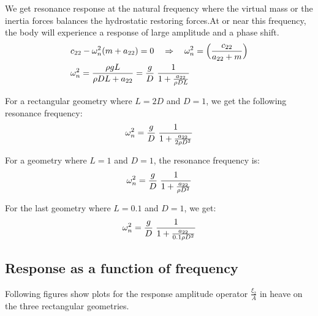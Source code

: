 \documentclass[a4paper,10pt]{article}
\begin{document}
We get resonance response at the natural frequency where the virtual mass or the inertia forces balances the hydrostatic restoring forces.At or near this frequency, the body will experience a response of large amplitude and a phase shift.\\

\begin{align}
&c_{22} - \omega_n^2 (m + a_{22}) = 0 \quad \Rightarrow \quad \omega_n^2 = \Big( \frac{c_{22}}{a_{22} + m} \Big)\\
& \omega_n^2 = \frac{\rho g L}{\rho D L + a_{22}} = \frac{g}{D}\hspace{1mm}\frac{1}{1 + \frac{a_{22}}{\rho D L}} 
\end{align}

For a rectangular geometry where $L=2D$ and $D=1$, we get the following resonance frequency:
$$\omega_n^2 = \frac{g}{D}\hspace{1mm}\frac{1}{1 + \frac{a_{22}}{2 \rho D^2}} $$

For a geometry where $L=1$ and $D=1$, the resonance frequency is:
$$\omega_n^2 = \frac{g}{D}\hspace{1mm}\frac{1}{1 + \frac{a_{22}}{ \rho D^2}} $$

For the last geometry where $L=0.1$ and $D=1$, we get:
$$ \omega_n^2 = \frac{g}{D}\hspace{1mm}\frac{1}{1 + \frac{a_{22}}{ 0.1 \rho D^2}} $$


\subsection{Response as a function of frequency}

Following figures show plots for the response amplitude operator $\frac{\xi_2}{A}$ in heave on the three rectangular geometries.
\end{document}
